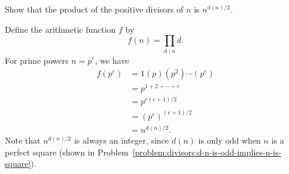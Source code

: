  Show that the product of the positive divisors of $n$ is
$n^{d(n)/2}$.
\begin{solution}
  Define the arithmetic function $f$ by
  \begin{equation*}
    f(n) = \prod_{d\mid n}d.
  \end{equation*}
  For prime powers $n = p^e$, we have
  \begin{align*}
    f(p^e) &= 1(p)(p^2)\cdots(p^e) \\
           &= p^{1+2+\cdots+e} \\
           &= p^{e(e+1)/2} \\
           &= (p^e)^{(e+1)/2} \\
           &= n^{d(n)/2}.
  \end{align*}
  Note that $n^{d(n)/2}$ is always an integer, since $d(n)$ is only
  odd when $n$ is a perfect square (shown in
  Problem~\ref{problem:divisors:d-n-is-odd-implies-n-is-square}).


\end{solution}
